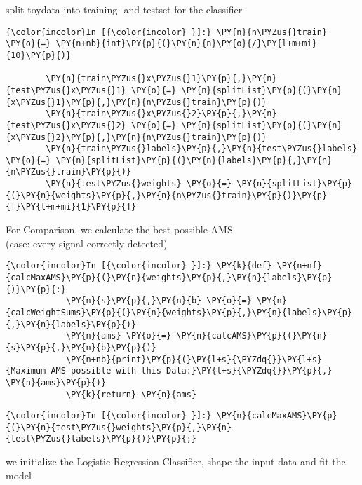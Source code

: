     split toydata into training- and testset for the classifier

    \begin{Verbatim}[commandchars=\\\{\}]
{\color{incolor}In [{\color{incolor} }]:} \PY{n}{n\PYZus{}train} \PY{o}{=} \PY{n+nb}{int}\PY{p}{(}\PY{n}{n}\PY{o}{/}\PY{l+m+mi}{10}\PY{p}{)}
        
        \PY{n}{train\PYZus{}x\PYZus{}1}\PY{p}{,}\PY{n}{test\PYZus{}x\PYZus{}1} \PY{o}{=} \PY{n}{splitList}\PY{p}{(}\PY{n}{x\PYZus{}1}\PY{p}{,}\PY{n}{n\PYZus{}train}\PY{p}{)}
        \PY{n}{train\PYZus{}x\PYZus{}2}\PY{p}{,}\PY{n}{test\PYZus{}x\PYZus{}2} \PY{o}{=} \PY{n}{splitList}\PY{p}{(}\PY{n}{x\PYZus{}2}\PY{p}{,}\PY{n}{n\PYZus{}train}\PY{p}{)}
        \PY{n}{train\PYZus{}labels}\PY{p}{,}\PY{n}{test\PYZus{}labels} \PY{o}{=} \PY{n}{splitList}\PY{p}{(}\PY{n}{labels}\PY{p}{,}\PY{n}{n\PYZus{}train}\PY{p}{)}
        \PY{n}{test\PYZus{}weights} \PY{o}{=} \PY{n}{splitList}\PY{p}{(}\PY{n}{weights}\PY{p}{,}\PY{n}{n\PYZus{}train}\PY{p}{)}\PY{p}{[}\PY{l+m+mi}{1}\PY{p}{]}
\end{Verbatim}

    For Comparison, we calculate the best possible AMS\\
(case: every signal correctly detected)

    \begin{Verbatim}[commandchars=\\\{\}]
{\color{incolor}In [{\color{incolor} }]:} \PY{k}{def} \PY{n+nf}{calcMaxAMS}\PY{p}{(}\PY{n}{weights}\PY{p}{,}\PY{n}{labels}\PY{p}{)}\PY{p}{:}
            \PY{n}{s}\PY{p}{,}\PY{n}{b} \PY{o}{=} \PY{n}{calcWeightSums}\PY{p}{(}\PY{n}{weights}\PY{p}{,}\PY{n}{labels}\PY{p}{,}\PY{n}{labels}\PY{p}{)}
            \PY{n}{ams} \PY{o}{=} \PY{n}{calcAMS}\PY{p}{(}\PY{n}{s}\PY{p}{,}\PY{n}{b}\PY{p}{)}
            \PY{n+nb}{print}\PY{p}{(}\PY{l+s}{\PYZdq{}}\PY{l+s}{Maximum AMS possible with this Data:}\PY{l+s}{\PYZdq{}}\PY{p}{,} \PY{n}{ams}\PY{p}{)}
            \PY{k}{return} \PY{n}{ams}
\end{Verbatim}

    \begin{Verbatim}[commandchars=\\\{\}]
{\color{incolor}In [{\color{incolor} }]:} \PY{n}{calcMaxAMS}\PY{p}{(}\PY{n}{test\PYZus{}weights}\PY{p}{,}\PY{n}{test\PYZus{}labels}\PY{p}{)}\PY{p}{;}
\end{Verbatim}

    we initialize the Logistic Regression Classifier, shape the input-data
and fit the model

